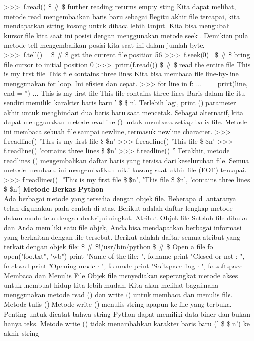>>>~f.read()   \$  \#  \$ further reading returns empty sting 
Kita dapat melihat, metode read mengembalikan baris baru sebagai Begitu akhir file tercapai, kita mendapatkan string kosong untuk dibaca lebih lanjut. Kita bisa mengubah kursor file kita saat ini posisi dengan menggunakan metode seek . Demikian pula metode tell mengembalikan posisi kita saat ini dalam jumlah byte.  
>>>~f.tell()~~   \$  \#  \$ get the current file position  
56 
>>>~f.seek(0)~   \$  \#  \$ bring file cursor to initial position  
0  
>>>~print(f.read())   \$  \#  \$ read the entire file  
This is my first file  
This file 
contains three lines 
Kita bisa membaca file line-by-line menggunakan for loop. Ini efisien dan cepat. 
>>> for line in f:  
...~~~~ print(line, end = '')  
... 
This is my first file 
This file  
contains three lines 
Baris dalam file itu sendiri memiliki karakter baris baru ' \$  \setminus  \$ n'. Terlebih lagi, print () parameter akhir untuk menghindari dua baris baru saat mencetak. Sebagai alternatif, kita dapat menggunakan metode readline () untuk membaca setiap baris file. Metode ini membaca sebuah file sampai newline, termasuk newline character.
>>> f.readline()  
'This is my first file \$  \setminus  \$n'  
>>> f.readline()  
'This file \$  \setminus  \$n'  
>>> f.readline()  
'contains three lines \$  \setminus  \$n' 
>>> f.readline()  
'' 
Terakhir, metode readlines () mengembalikan daftar baris yang tersisa dari keseluruhan file. Semua metode membaca ini mengembalikan nilai kosong saat akhir file (EOF) tercapai.  
>>> f.readlines()  
['This is my first file \$  \setminus  \$n', 'This file \$  \setminus  \$n', 'contains three lines \$  \setminus  \$n'] 
{\fontsize{14pt}{14pt}\selectfont \textbf{Metode Berkas Python} \\} 
Ada berbagai metode yang tersedia dengan objek file. Beberapa di antaranya telah digunakan pada contoh di atas. Berikut adalah daftar lengkap metode dalam mode teks dengan deskripsi singkat. Atribut Objek file Setelah file dibuka dan Anda memiliki satu file objek, Anda bisa mendapatkan berbagai informasi yang berkaitan dengan file tersebut. Berikut adalah daftar semua atribut yang terkait dengan objek file: 
 \$  \#  \$!/usr/bin/python 
 \$  \#  \$ Open a file  
fo = open("foo.txt", "wb") 
print "Name of the file: ", fo.name 
print "Closed or not : ", fo.closed 
print "Opening mode : ", fo.mode 
print "Softspace flag : ", fo.softspace  
Membaca dan Menulis File 
Objek file menyediakan seperangkat metode akses untuk membuat hidup kita lebih mudah. Kita akan melihat bagaimana menggunakan metode read () dan write () untuk membaca dan menulis file. Metode tulis () Metode write () menulis string apapun ke file yang terbuka. Penting untuk dicatat bahwa string Python dapat memiliki data biner dan bukan hanya teks. Metode write () tidak menambahkan karakter baris baru (' \$  \setminus  \$ n') ke akhir string - 
